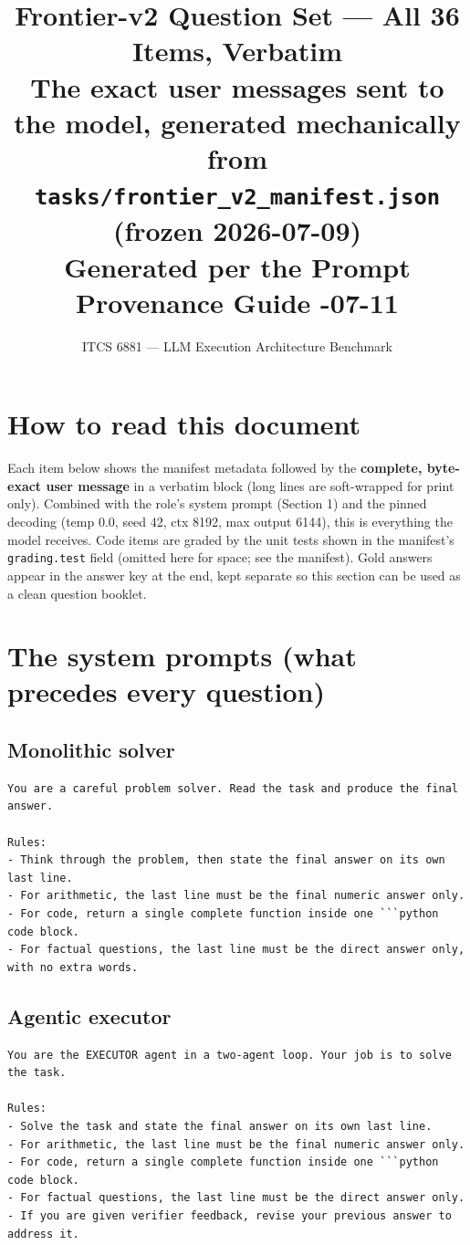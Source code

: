 \documentclass[10pt]{article}
\title{Frontier-v2 Question Set --- All 36 Items, Verbatim\\
\large The exact user messages sent to the model, generated mechanically from
\texttt{tasks/frontier\_v2\_manifest.json} (frozen 2026-07-09)\\
\normalsize Generated per the Prompt Provenance Guide \quad 2026-07-11}
\author{ITCS 6881 --- LLM Execution Architecture Benchmark}
\date{}
\begin{document}
\maketitle
\thispagestyle{fancy}

\section*{How to read this document}
Each item below shows the manifest metadata followed by the \textbf{complete,
byte-exact user message} in a verbatim block (long lines are soft-wrapped for
print only). Combined with the role's system prompt (Section 1) and the pinned
decoding (temp 0.0, seed 42, ctx 8192, max output 6144), this is everything the
model receives. Code items are graded by the unit tests shown in the manifest's
\texttt{grading.test} field (omitted here for space; see the manifest). Gold
answers appear in the answer key at the end, kept separate so this section can be
used as a clean question booklet.

\section{The system prompts (what precedes every question)}
\subsection*{Monolithic solver}
\begin{verbatim}
You are a careful problem solver. Read the task and produce the final answer.

Rules:
- Think through the problem, then state the final answer on its own last line.
- For arithmetic, the last line must be the final numeric answer only.
- For code, return a single complete function inside one ```python code block.
- For factual questions, the last line must be the direct answer only, with no extra words.
\end{verbatim}
\subsection*{Agentic executor}
\begin{verbatim}
You are the EXECUTOR agent in a two-agent loop. Your job is to solve the task.

Rules:
- Solve the task and state the final answer on its own last line.
- For arithmetic, the last line must be the final numeric answer only.
- For code, return a single complete function inside one ```python code block.
- For factual questions, the last line must be the direct answer only.
- If you are given verifier feedback, revise your previous answer to address it.
\end{verbatim}
\end{document}
